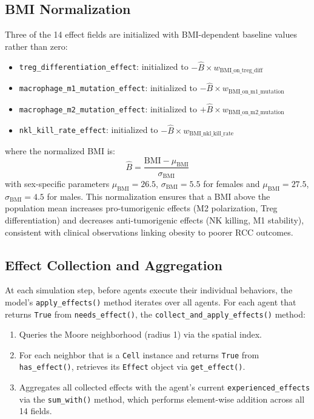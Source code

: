 \subsection{BMI Normalization}
\label{subsec:md_bmi}

Three of the 14 effect fields are initialized with BMI-dependent baseline values rather than zero:

\begin{itemize}
    \item \texttt{treg\_differentiation\_effect}: initialized to $-\hat{B} \times w_{\text{BMI\_on\_treg\_diff}}$
    \item \texttt{macrophage\_m1\_mutation\_effect}: initialized to $-\hat{B} \times w_{\text{BMI\_on\_m1\_mutation}}$
    \item \texttt{macrophage\_m2\_mutation\_effect}: initialized to $+\hat{B} \times w_{\text{BMI\_on\_m2\_mutation}}$
    \item \texttt{nkl\_kill\_rate\_effect}: initialized to $-\hat{B} \times w_{\text{BMI\_nkl\_kill\_rate}}$
\end{itemize}

\noindent where the normalized BMI is:
\begin{equation}
    \hat{B} = \frac{\text{BMI} - \mu_{\text{BMI}}}{\sigma_{\text{BMI}}}
    \label{eq:bmi_norm}
\end{equation}
with sex-specific parameters $\mu_{\text{BMI}} = 26.5$, $\sigma_{\text{BMI}} = 5.5$ for females and $\mu_{\text{BMI}} = 27.5$, $\sigma_{\text{BMI}} = 4.5$ for males. This normalization ensures that a BMI above the population mean increases pro-tumorigenic effects (M2 polarization, Treg differentiation) and decreases anti-tumorigenic effects (NK killing, M1 stability), consistent with clinical observations linking obesity to poorer RCC outcomes.

\subsection{Effect Collection and Aggregation}
\label{subsec:md_effect_collection}

At each simulation step, before agents execute their individual behaviors, the model's \texttt{apply\_effects()} method iterates over all agents. For each agent that returns \texttt{True} from \texttt{needs\_effect()}, the \texttt{collect\_and\_apply\_effects()} method:

\begin{enumerate}[nosep]
    \item Queries the Moore neighborhood (radius 1) via the spatial index.
    \item For each neighbor that is a \texttt{Cell} instance and returns \texttt{True} from \texttt{has\_effect()}, retrieves its \texttt{Effect} object via \texttt{get\_effect()}.
    \item Aggregates all collected effects with the agent's current \texttt{experienced\_effects} via the \texttt{sum\_with()} method, which performs element-wise addition across all 14 fields.
\end{enumerate}

